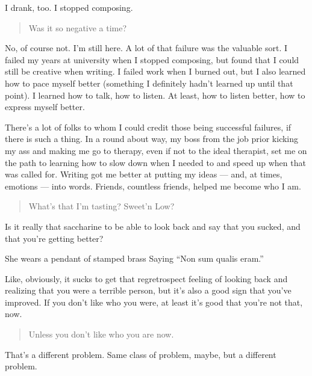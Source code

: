 I drank, too. I stopped composing.

\begin{quote}
Was it so negative a time?
\end{quote}

No, of course not. I'm still here. A lot of that failure was the valuable sort. I failed my years at university when I stopped composing, but found that I could still be creative when writing. I failed work when I burned out, but I also learned how to pace myself better (something I definitely hadn't learned up until that point). I learned how to talk, how to listen. At least, how to listen better, how to express myself better.

There's a lot of folks to whom I could credit those being successful failures, if there is such a thing. In a round about way, my boss from the job prior kicking my ass and making me go to therapy, even if not to the ideal therapist, set me on the path to learning how to slow down when I needed to and speed up when that was called for. Writing got me better at putting my ideas --- and, at times, emotions --- into words. Friends, countless friends, helped me become who I am.

\begin{quote}
What's that I'm tasting? Sweet'n Low?
\end{quote}

Is it really that saccharine to be able to look back and say that you sucked, and that you're getting better?

She wears a pendant of stamped brass Saying ``Non sum qualis eram.''

Like, obviously, it sucks to get that regretrospect feeling of looking back and realizing that you were a terrible person, but it's also a good sign that you've improved. If you don't like who you were, at least it's good that you're not that, now.

\begin{quote}
Unless you don't like who you are now.
\end{quote}

That's a different problem. Same class of problem, maybe, but a different problem.
